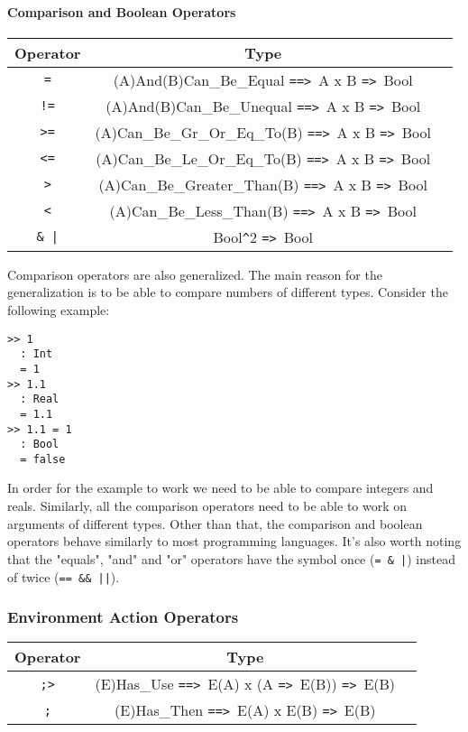 \documentclass{article}
\def\ra{\texttt{=>}\ }
\def\Ra{\texttt{==>}\ }
\begin{document}
\paragraph{Comparison and Boolean Operators}

\begin{center}
\begin{tabular}{ |c|c|c| } 
\hline
Operator & Type \\ 
\hline
\hline
\texttt{=} & (A)And(B)Can_Be_Equal \Ra A x B \ra Bool \\
\hline
\texttt{!=} & (A)And(B)Can_Be_Unequal \Ra A x B \ra Bool \\
\hline
\texttt{>=} & (A)Can_Be_Gr_Or_Eq_To(B) \Ra A x B \ra Bool \\
\hline
\texttt{<=} & (A)Can_Be_Le_Or_Eq_To(B) \Ra A x B \ra Bool \\
\hline
\texttt{>} & (A)Can_Be_Greater_Than(B) \Ra A x B \ra Bool \\
\hline
\texttt{<} & (A)Can_Be_Less_Than(B) \Ra A x B \ra Bool \\
\hline
\texttt{\& |} & Bool\texttt{\^}2 \ra Bool \\
\hline
\end{tabular}
\end{center}
Comparison operators are also generalized. The main reason for the
generalization is to be able to compare numbers of different types. Consider
the following example:

\begin{verbatim}
>> 1
  : Int
  = 1
>> 1.1
  : Real
  = 1.1
>> 1.1 = 1
  : Bool
  = false
\end{verbatim}
In order for the example to work we need to be able to compare integers and
reals.  Similarly, all the comparison operators need to be able to work on
arguments of different types. Other than that, the comparison and boolean
operators behave similarly to most programming languages. It's also worth
noting that the "equals", "and" and "or" operators have the symbol once
(\texttt{= \& |}) instead of twice (\texttt{== \&\& ||}).

\subsubsection{Environment Action Operators}
\label{subsec:envacts}

\begin{center}
\begin{tabular}{ |c|c|c| } 
\hline
Operator & Type \\ 
\hline
\hline
\texttt{;>} & (E)Has_Use \Ra E(A) x (A \ra E(B)) \ra E(B) \\
\hline
\texttt{;} & (E)Has_Then \Ra E(A) x E(B) \ra E(B) \\
\hline
\end{tabular}
\end{center}
\end{document}
